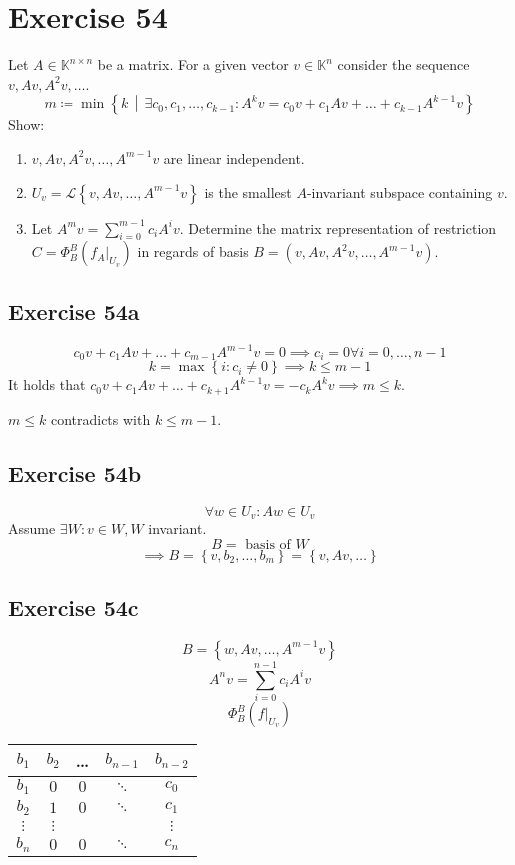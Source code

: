 \documentclass[a4paper]{article}
\theoremstyle{definition}
\newcommand\set[1]{\left\{#1\right\}}
\newcommand\setdef[2]{\left\{#1\,\middle|\,#2\right\}}
\begin{document}
\section{Exercise 54}
\begin{ex}
  Let $A \in \mathbb K^{n \times n}$ be a matrix. For a given vector $v \in \mathbb K^n$ consider the sequence $v, Av, A^2 v, \dots$.
  \[ m \coloneqq \min\setdef{k}{\exists c_0, c_1, \dots, c_{k-1}: A^k v = c_0 v + c_1 Av + \dots + c_{k-1} A^{k-1} v} \]
  Show:
  \begin{enumerate}
    \item $v, Av, A^2 v, \dots, A^{m-1} v$ are linear independent.
    \item $U_v = \mathcal L\set{v, Av, \dots, A^{m-1} v}$ is the smallest $A$-invariant subspace containing $v$.
    \item Let $A^m v = \sum_{i=0}^{m-1} c_i A^i v$. Determine the matrix representation of restriction $C = \Phi_B^B(f_A|_{U_v})$ in regards of basis $B = (v, Av, A^2 v, \dots, A^{m-1} v)$.
  \end{enumerate}
\end{ex}

\subsection{Exercise 54a}
\[ c_0 v + c_1 Av + \dots + c_{m-1} A^{m-1} v = 0 \implies c_i = 0 \forall i = 0, \dots, n-1 \]
\[ k = \max\set{i: c_i \neq 0} \implies k \leq m - 1  \]
It holds that $c_0 v + c_1 Av + \dots + c_{k+1} A^{k-1} v = -c_k A^k v \implies m \leq k$.

$m \leq k$ contradicts with $k \leq m-1$.

\subsection{Exercise 54b}
\[ \forall w \in U_v: Aw \in U_v \]
Assume $\exists W: v \in W, W$ invariant.
\[ B = \text{ basis of } W \]
\[ \implies B = \set{v, b_2, \dots, b_m} = \set{v, Av, \dots} \]

\subsection{Exercise 54c}
\[ B = \set{w, Av, \dots, A^{m-1} v} \]
\[ A^n v = \sum_{i=0}^{n-1} c_i A^i v \]
\[ \Phi_B^B(f|_{U_v}) \]

\begin{table}
  \begin{center}
    \begin{tabular}{ccccc}
      $b_1$ & $b_2$ & \dots & $b_{n-1}$ & $b_{n-2}$ \\
    \hline
      $b_1$ & $0$ & $0$ & $\ddots$ & $c_0$ \\
      $b_2$ & $1$ & $0$ & $\ddots$ & $c_1$ \\
      $\vdots$ & $\vdots$ & & & $\vdots$ \\
      $b_n$ & $0$ & $0$ & $\ddots$ & $c_n$
    \end{tabular}
  \end{center}
\end{table}
\end{document}
